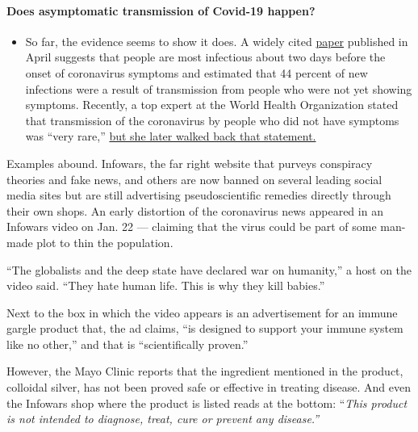 \begin{itemize}
{  \paragraph{Does asymptomatic transmission of Covid-19
  happen?}\label{does-asymptomatic-transmission-of-covid-19-happen}}

  \begin{itemize}
  \tightlist
  \item
    So far, the evidence seems to show it does. A widely cited
    \href{https://www.nature.com/articles/s41591-020-0869-5}{paper}
    published in April suggests that people are most infectious about
    two days before the onset of coronavirus symptoms and estimated that
    44 percent of new infections were a result of transmission from
    people who were not yet showing symptoms. Recently, a top expert at
    the World Health Organization stated that transmission of the
    coronavirus by people who did not have symptoms was ``very rare,''
    \href{https://www.nytimes.com/2020/06/09/world/coronavirus-updates.html?action=click\&pgtype=Article\&state=default\&region=MAIN_CONTENT_3\&context=storylines_faq\#link-1f302e21}{but
    she later walked back that statement.}
  \end{itemize}
\end{itemize}

Examples abound. Infowars, the far right website that purveys conspiracy
theories and fake news, and others are now banned on several leading
social media sites but are still advertising pseudoscientific remedies
directly through their own shops. An early distortion of the coronavirus
news appeared in an Infowars video on Jan. 22 --- claiming that the
virus could be part of some man-made plot to thin the population.

``The globalists and the deep state have declared war on humanity,'' a
host on the video said. ``They hate human life. This is why they kill
babies.''

Next to the box in which the video appears is an advertisement for an
immune gargle product that, the ad claims, ``is designed to support your
immune system like no other,'' and that is ``scientifically proven.''

However, the Mayo Clinic reports that the ingredient mentioned in the
product, colloidal silver, has not been proved safe or effective in
treating disease. And even the Infowars shop where the product is listed
reads at the bottom: ``\emph{This product is not intended to diagnose,
treat, cure or prevent any disease.''}

